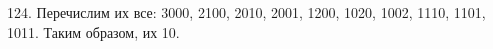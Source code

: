 124. Перечислим их все: 3000, 2100, 2010, 2001, 1200, 1020, 1002, 1110, 1101, 1011. Таким образом, их 10.\\
